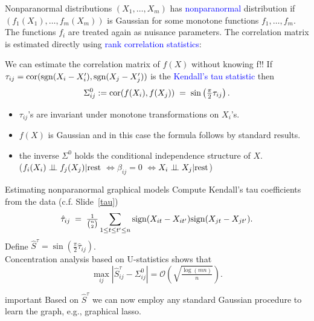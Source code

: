 \documentclass[11pt,handout,aspectratio=169,dvipsnames]{beamer}
\begin{document}
\begin{frame}[label=npn]{Nonparanormal distributions}
	$(X_1,\ldots,X_m)$ has \textcolor{blue}{nonparanormal} distribution if $(f_1(X_1),\ldots,f_m(X_m))$ is Gaussian for some monotone functions $f_1,\ldots,f_m$.\\[.3cm]
	The functions $f_i$ are treated again as nuisance parameters. The correlation matrix is estimated directly using \textcolor{blue}{rank correlation statistics}:\\[.2cm]
	\begin{alertblock}{We can estimate the correlation matrix of $f(X)$ without knowing f!!}
		If $\tau_{ij}={\rm cor}({\rm sgn}(X_i-X_i'),{\rm sgn}(X_j-X_j'))$ is the \textcolor{blue}{Kendall's tau statistic} then
	$$
	\Sigma^0_{ij}:={\rm cor}(f(X_i),f(X_j))\;=\;\sin\left(\tfrac{\pi}{2}\tau_{ij}\right).
	$$
	\vspace{-.8cm}
	\begin{itemize}
		\item $\tau_{ij}$'s are invariant under monotone transformations on $X_i$'s.
		\item $f(X)$ is Gaussian and in this case the formula follows by standard results.
		\item the inverse $\Sigma^0$ holds the conditional independence structure of $X$.\\{\footnotesize ($f_i(X_i)\perp\!\!\! \perp f_j(X_j)|{\rm rest}$ \qquad$\Leftrightarrow$\qquad $\beta_{ij}=0$ \qquad$\Leftrightarrow$\qquad $X_i \perp\!\!\! \perp X_j|{\rm rest}$)}
	\end{itemize}
	\end{alertblock}
\end{frame}


\begin{frame}[label=npn2]{Estimating nonparanormal graphical models}
		Compute \alert{Kendall's tau} coefficients from the data (c.f. Slide~\ref{tau}) 	$$
	\hat \tau_{ij}\;=\;\tfrac{1}{{n\choose 2}}\sum_{1\leq t\leq t'\leq n}{\rm sign}(X_{it}-X_{it'}){\rm sign}(X_{jt}-X_{jt'}).
	$$
	Define $\hat S^\tau=\sin(\tfrac{\pi}{2}\hat\tau_{ij})$.\\[.3cm]
	Concentration analysis based on U-statistics shows that
	$$
	\max_{ij}|\hat S^\tau_{ij}-\Sigma^0_{ij}|=\mathcal O\left(\sqrt{\tfrac{\log(mn)}{n}}\right).
	$$
	\begin{beamercolorbox}[wd=\paperwidth,sep=5pt]{important}
		Based on $\hat S^\tau$ we can now employ any standard Gaussian procedure to learn the graph, e.g., graphical lasso.
	\end{beamercolorbox}

\end{frame}
\end{document}

